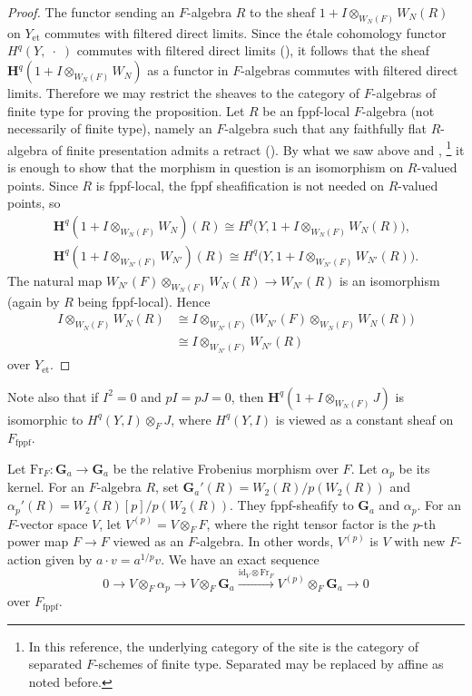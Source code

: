 \documentclass{amsart}
\theoremstyle{remark}
\numberwithin{equation}{section}
\newcommand{\tensor}{\mathbin{\otimes}}
\newcommand{\et}{\mathrm{et}}
\newcommand{\fppf}{\mathrm{fppf}}
\newcommand{\id}{\mathrm{id}}
\newcommand{\Ga}{\mathbf{G}_{a}}
\newcommand{\alg}[1]{\mathbf{#1}}
\newcommand{\var}{\;\cdot\;}
\newcommand{\Frob}{\mathrm{Fr}}
\begin{document}
\begin{proof}
	The functor sending an $F$-algebra $R$ to
	the sheaf $1 + I \tensor_{W_{N}(F)} W_{N}(R)$ on $Y_{\et}$
	commutes with filtered direct limits.
	Since the \'etale cohomology functor $H^{q}(Y, \var)$ commutes
	with filtered direct limits (\cite[Tag 03Q5]{Sta22}),
	it follows that the sheaf $\alg{H}^{q}(1 + I \tensor_{W_{N}(F)} W_{N})$
	as a functor in $F$-algebras commutes with filtered direct limits.
	Therefore we may restrict the sheaves to the category of $F$-algebras of finite type
	for proving the proposition.
	Let $R$ be an fppf-local $F$-algebra (not necessarily of finite type),
	namely an $F$-algebra such that
	any faithfully flat $R$-algebra of finite presentation admits a retract
	(\cite[Definition 0.1]{GK15}).
	By what we saw above and \cite[Theorem 0.2]{GK15},%
	\footnote{
		In this reference, the underlying category of the site is
		the category of separated $F$-schemes of finite type.
		Separated may be replaced by affine as noted before.
	}
	it is enough to show that the morphism in question is an isomorphism on $R$-valued points.
	Since $R$ is fppf-local, the fppf sheafification is not needed on $R$-valued points, so
		\begin{gather*}
					\alg{H}^{q}(1 + I \tensor_{W_{N}(F)} W_{N})(R)
				\cong
					H^{q} \bigl(
						Y,
						1 + I \tensor_{W_{N}(F)} W_{N}(R)
					\bigr),
			\\
					\alg{H}^{q}(1 + I \tensor_{W_{N'}(F)} W_{N'})(R)
				\cong
					H^{q} \bigl(
						Y,
						1 + I \tensor_{W_{N'}(F)} W_{N'}(R)
					\bigr).
		\end{gather*}
	The natural map $W_{N'}(F) \tensor_{W_{N}(F)} W_{N}(R) \to W_{N'}(R)$
	is an isomorphism (again by $R$ being fppf-local).
	Hence
		\begin{align*}
					I \tensor_{W_{N}(F)} W_{N}(R)
			&	\cong
					I \tensor_{W_{N'}(F)} \bigl(
						W_{N'}(F) \tensor_{W_{N}(F)} W_{N}(R)
					\bigr)
			\\
			&	\cong
					I \tensor_{W_{N'}(F)} W_{N'}(R)
		\end{align*}
	over $Y_{\et}$.
\end{proof}

Note also that if $I^{2} = 0$ and $p I = p J = 0$,
then $\alg{H}^{q}(1 + I \tensor_{W_{N}(F)} J)$ is isomorphic to
$H^{q}(Y, I) \tensor_{F} J$,
where $H^{q}(Y, I)$ is viewed as a constant sheaf on $F_{\fppf}$.

Let $\Frob_{F} \colon \Ga \to \Ga$ be the relative Frobenius morphism over $F$.
Let $\alpha_{p}$ be its kernel.
For an $F$-algebra $R$, set $\Ga'(R) = W_{2}(R) / p(W_{2}(R))$
and $\alpha_{p}'(R) = W_{2}(R)[p] / p(W_{2}(R))$.
They fppf-sheafify to $\Ga$ and $\alpha_{p}$.
For an $F$-vector space $V$, let $V^{(p)} = V \tensor_{F} F$,
where the right tensor factor is the $p$-th power map $F \to F$ viewed as an $F$-algebra.
In other words, $V^{(p)}$ is $V$ with new $F$-action given by $a \cdot v = a^{1 / p} v$.
We have an exact sequence
	\begin{equation} \label{0061}
			0
		\to
			V \tensor_{F} \alpha_{p}
		\to
			V \tensor_{F} \Ga
		\stackrel{\id_{V} \tensor \Frob_{F}}{\to}
			V^{(p)} \tensor_{F} \Ga
		\to
			0
	\end{equation}
over $F_{\fppf}$.
\end{document}
